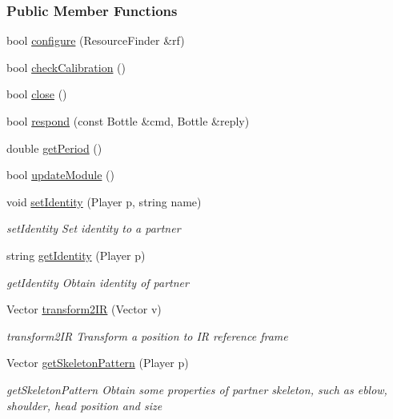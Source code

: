 \subsubsection*{Public Member Functions}
\begin{DoxyCompactItemize}
\item 
bool \hyperlink{group__agentDetector_a533b84ddb447390ef80cc8386918f642}{configure} (Resource\+Finder \&rf)
\item 
bool \hyperlink{group__agentDetector_aff2af42266faa0da3afc95a062b4f1d0}{check\+Calibration} ()
\item 
bool \hyperlink{group__agentDetector_ad64b374c4a8778157104c12c1d1869b5}{close} ()
\item 
bool \hyperlink{group__agentDetector_aa95b702577413fcefcdaeda24ca340ba}{respond} (const Bottle \&cmd, Bottle \&reply)
\item 
double \hyperlink{group__agentDetector_a8cf24dd16e761eb5492f178e0307e288}{get\+Period} ()
\item 
bool \hyperlink{group__agentDetector_a7efc1a96bdabfa4f2d995277df21132e}{update\+Module} ()
\item 
void \hyperlink{group__agentDetector_a31c14a80218f798b615ead89d062e700}{set\+Identity} (Player p, string name)
\begin{DoxyCompactList}\small\item\em set\+Identity Set identity to a partner \end{DoxyCompactList}\item 
string \hyperlink{group__agentDetector_af559f7bc17005f4bb49931533deffe5e}{get\+Identity} (Player p)
\begin{DoxyCompactList}\small\item\em get\+Identity Obtain identity of partner \end{DoxyCompactList}\item 
Vector \hyperlink{group__agentDetector_a8639602ced96cef823d2f3d442159d94}{transform2\+IR} (Vector v)
\begin{DoxyCompactList}\small\item\em transform2\+IR Transform a position to IR reference frame \end{DoxyCompactList}\item 
Vector \hyperlink{group__agentDetector_a0b84169ad615735082f1fa765469212e}{get\+Skeleton\+Pattern} (Player p)
\begin{DoxyCompactList}\small\item\em get\+Skeleton\+Pattern Obtain some properties of partner skeleton, such as eblow, shoulder, head position and size \end{DoxyCompactList}\end{DoxyCompactItemize}
